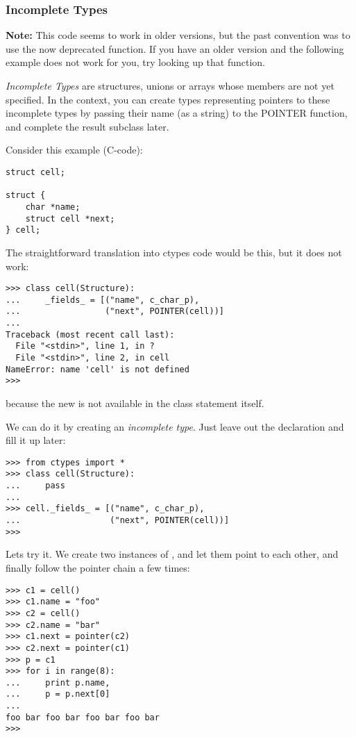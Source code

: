 \subsubsection{Incomplete Types\label{ctypes-incomplete-types}}

\textbf{Note:} This code seems to work in older versions, but the past
convention was to use the now deprecated  function.
If you have an older version and the following example does not work
for you, try looking up that function.

\emph{Incomplete Types} are structures, unions or arrays whose members are
not yet specified. In the  context, you can create types
representing pointers to these incomplete types by passing their name
(as a string) to the POINTER function, and complete the result
subclass later.

Consider this example (C-code):
\begin{verbatim}
struct cell;

struct {
    char *name;
    struct cell *next;
} cell;
\end{verbatim}

The straightforward translation into ctypes code would be this, but it
does not work:
\begin{verbatim}
>>> class cell(Structure):
...     _fields_ = [("name", c_char_p),
...                 ("next", POINTER(cell))]
...
Traceback (most recent call last):
  File "<stdin>", line 1, in ?
  File "<stdin>", line 2, in cell
NameError: name 'cell' is not defined
>>>
\end{verbatim}

because the new  is not available in the class statement
itself.

We can do it by creating an \emph{incomplete type}. Just leave out the
 declaration and fill it up later:
\begin{verbatim}
>>> from ctypes import *
>>> class cell(Structure):
...     pass
...
>>> cell._fields_ = [("name", c_char_p),
...                  ("next", POINTER(cell))]
>>>
\end{verbatim}

Lets try it. We create two instances of , and let them point
to each other, and finally follow the pointer chain a few times:
\begin{verbatim}
>>> c1 = cell()
>>> c1.name = "foo"
>>> c2 = cell()
>>> c2.name = "bar"
>>> c1.next = pointer(c2)
>>> c2.next = pointer(c1)
>>> p = c1
>>> for i in range(8):
...     print p.name,
...     p = p.next[0]
...
foo bar foo bar foo bar foo bar
>>>
\end{verbatim}


